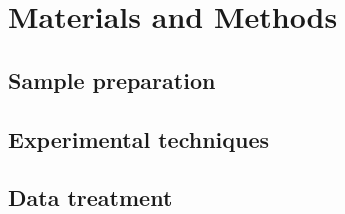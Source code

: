 \chapter{Materials and Methods}

\section{Sample preparation}

\section{Experimental techniques}

\section{Data treatment}
